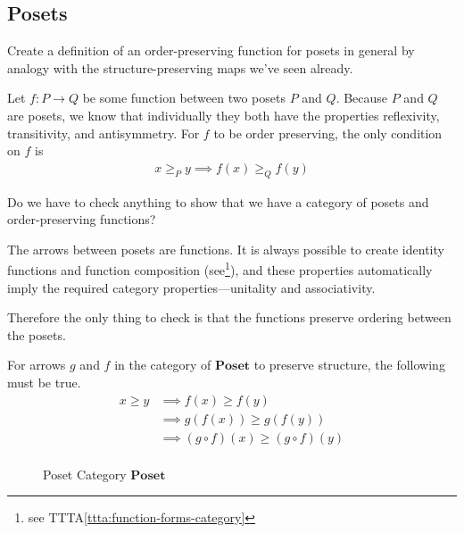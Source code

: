 \subsection{Posets}
\begin{ttta}
	Create a definition of an order-preserving function for posets in general by
	analogy with the structure-preserving maps we've seen already.
\end{ttta}
\begin{proofitem}
	\item Let $f:P\rightarrow Q$ be some function between two posets $P$ and $Q$.
	Because $P$ and $Q$ are posets, we know that individually they both have the
	properties reflexivity, transitivity, and antisymmetry. For $f$ to be order
	preserving, the only condition on $f$ is
	\begin{align*}
		x\geq_P y \implies f(x)\geq_Q f(y)
	\end{align*}
\end{proofitem}

\begin{ttta}
	Do we have to check anything to show that we have a category of posets and order-preserving functions?
\end{ttta}
\begin{proofitem}
	\item The arrows between posets are functions. It is always possible to create
	identity functions and function composition (see\footnote{see TTTA\ref{ttta:function-forms-category}}), and these properties
	automatically imply the required category properties---unitality and associativity.
	\item Therefore the only thing to check is that the functions preserve ordering
	between the posets.
\end{proofitem}
For arrows $g$ and $f$ in the category of $\mathbf{Poset}$ to preserve
structure, the following must be true.
\begin{align*}
	x \geq y & \implies f(x) \geq f(y)                   \\
	         & \implies g(f(x)) \geq g(f(y))             \\
	         & \implies (g\circ f)(x) \geq (g\circ f)(y) \\
\end{align*}
\begin{figure}[H]
	\begin{center}
		
	\end{center}
	\caption{Poset Category $\mathbf{Poset}$}
\end{figure}

